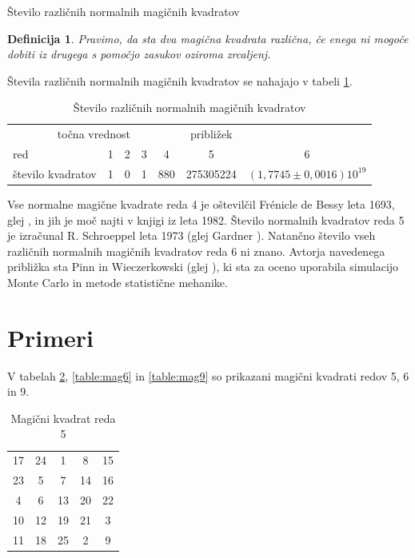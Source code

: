 \documentclass[a4paper,12pt]{article}
\newtheorem{definicija}[izrek]{Definicija}
\newcommand{\pojem}[1]{\emph{}{\color{purple}#1}}
\begin{document}
Število različnih normalnih magičnih kvadratov

\begin{definicija}
      Pravimo, da sta dva magična kvadrata \pojem{različna}, če enega ni mogoče dobiti
      iz drugega s pomočjo zasukov oziroma zrcaljenj.
\end{definicija}

Števila različnih normalnih magičnih kvadratov se nahajajo v tabeli \ref{table:stevila}.

\begin{table}
   \centering
   \caption{Število različnih normalnih magičnih kvadratov}
   \label{table:stevila}
   \begin{tabular}{lcccccc}\toprule
      \multicolumn{5}{c}{točna vrednost} & približek \\
      red & 1 & 2 & 3 & 4 & 5 & 6 \\
      število kvadratov & 1 & 0 & 1 & 880 & 275305224 & $(1,7745 \pm 0,0016)10^19$\\
      \bottomrule
   \end{tabular}
\end{table}

Vse normalne magične kvadrate reda 4 je oštevilčil Frénicle de Bessy
leta 1693, glej \cite{bessy}, in jih je moč najti v knjigi \cite{berlekamp}
iz leta 1982. Število normalnih kvadratov reda 5 je izračunal
R. Schroeppel leta 1973 (glej Gardner \cite{gardner}).
Natančno število vseh različnih normalnih magičnih kvadratov reda 6 ni znano.
Avtorja navedenega približka sta Pinn in Wieczerkowski (glej \cite{pinn}), ki
sta za oceno uporabila simulacijo Monte Carlo in metode statistične mehanike.


\section{Primeri}

V tabelah \ref{table:mag5}, \ref{table:mag6} in \ref{table:mag9} so prikazani
magični kvadrati redov 5, 6 in 9.

\begin{table}
   \centering
   \caption{Magični kvadrat reda 5}
   \label{table:mag5}
   \begin{tabular}{ccccc}
      \toprule
        17 & 24 &  1 &  8 & 15 \\
        23 &  5 &  7 & 14 & 16 \\
         4 &  6 & 13 & 20 & 22 \\
        10 & 12 & 19 & 21 &  3 \\
        11 & 18 & 25 &  2 &  9 \\
      \bottomrule
   \end{tabular}
\end{table}
\end{document}
